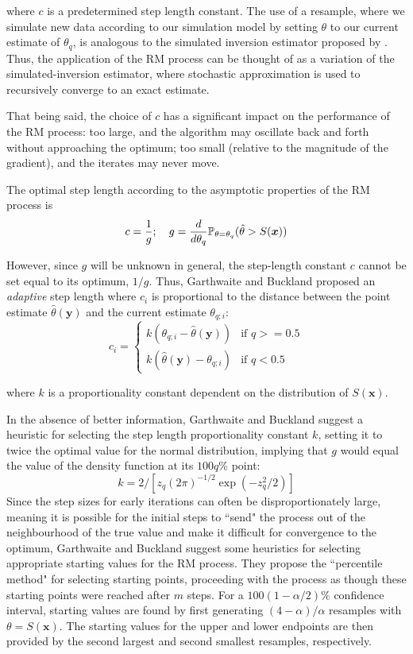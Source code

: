where $c$ is a predetermined step length constant. The use of a resample, where we simulate new data according to our simulation model by setting $\theta$ to our current estimate of $\theta_q$, is analogous to the simulated inversion estimator proposed by \citet{Huang2019}. Thus, the application of the RM process can be thought of as a variation of the simulated-inversion estimator, where stochastic approximation is used to recursively converge to an exact estimate.

That being said, the choice of $c$ has a significant impact on the performance of the RM process: too large, and the algorithm may oscillate back and forth without approaching the optimum; too small (relative to the magnitude of the gradient), and the iterates may never move. 

The optimal step length according to the asymptotic properties of the RM process is \begin{equation}
    c = \frac{1}{g};\quad g = \frac{d}{d\theta_q} \mathbb{P}_{\theta = \theta_q} (\hat\theta > S(\bm{x}))
\end{equation}

However, since $g$ will be unknown in general, the step-length constant $c$ cannot be set equal to its optimum, $1/g$. Thus, Garthwaite and Buckland proposed an \textit{adaptive} step length where $c_i$ is proportional to the distance between the point estimate $\hat\theta(\bm{y})$ and the current estimate $\theta_{q; i}$:\begin{equation} c_i = \begin{cases}
    k\left(\theta_{q; i} - \hat\theta(\bm{y}) \right) &\text{if $q >= 0.5$} \\
    k\left(\hat\theta(\bm{y}) - \theta_{q; i}\right) &\text{if $q < 0.5$}
\end{cases}
\end{equation}

where $k$ is a proportionality constant dependent on the distribution of $S(\bm{x})$.

In the absence of better information, Garthwaite and Buckland suggest a heuristic for selecting the step length proportionality constant $k$, setting it to twice the optimal value for the normal distribution, implying that $g$ would equal the value of the density function at its $100q$\% point: \[
k = 2/\left[z_q (2\pi)^{-1/2}\exp(-z_q^2/2)\right]
\]
Since the step sizes for early iterations can often be disproportionately large, meaning it is possible for the initial steps to ``send" the process out of the neighbourhood of the true value and make it difficult for convergence to the optimum, Garthwaite and Buckland suggest some heuristics for selecting appropriate starting values for the RM process. They propose the ``percentile method" for selecting starting points, proceeding with the process as though these starting points were reached after $m$ steps. For a $100(1-\alpha/2)\%$ confidence interval, starting values are found by first generating $(4-\alpha)/\alpha$ resamples with $\theta = S(\bm{x})$. The starting values for the upper and lower endpoints are then provided by the second largest and second smallest resamples, respectively.

